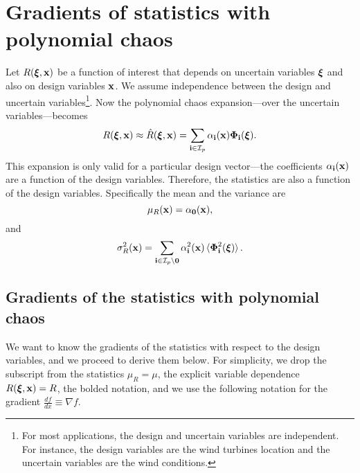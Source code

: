 \section{Gradients of statistics with polynomial chaos}
\label{sec:GradientStatistics0}
Let $R(\boldsymbol{\xi}, \mathbf{x})$ be a function of interest that depends on uncertain variables $\boldsymbol{\xi}$ and also on design variables $\mathbf{x}$. We assume independence between the design and uncertain variables\footnote{For most applications, the design and uncertain variables are independent. For instance, the design variables are the wind turbines location and the uncertain variables are the wind conditions.}. Now the polynomial chaos expansion---over the uncertain variables---becomes
\begin{equation}
  R(\boldsymbol{\xi},\mathbf{x}) \approx \hat{R}(\boldsymbol{\xi},\mathbf{x}) = \sum_{\mathbf{i}\in \mathcal{I}_p} \alpha_{\mathbf{i}}(\mathbf{x}) \boldsymbol{\Phi}_{\mathbf{i}}(\boldsymbol{\xi}).
\end{equation}
This expansion is only valid for a particular design vector---the coefficients $\alpha_{\mathbf{i}}(\mathbf{x})$ are a function of the design variables. Therefore, the statistics are also a function of the design variables. Specifically the mean and the variance are
\begin{equation}
	\mu_R(\mathbf{x}) = \alpha_\mathbf{0}(\mathbf{x}),
    \label{eq:meanDesign}
\end{equation}
and
\begin{equation}
  \sigma_R^2(\mathbf{x}) = \sum_{\mathbf{i}\in \mathcal{I}_p\setminus \mathbf{0}}
  \alpha_{\mathbf{i}}^2(\mathbf{x}) \braket{\boldsymbol{\Phi}_{\mathbf{i}}^2(\boldsymbol{\xi})}.
  \label{eq:varDesign}
\end{equation}
\subsection{Gradients of the statistics with polynomial chaos}
\label{sec:GradientsStatistics}
We want to know the gradients of the statistics with respect to the design variables, and we proceed to derive them below. For simplicity, we drop the subscript from the statistics $\mu_R = \mu$, the explicit variable dependence $R(\boldsymbol{\xi},\mathbf{x})=R$, the bolded notation, and we use the following notation for the gradient $\frac{df}{dx} \equiv \nabla f$.

